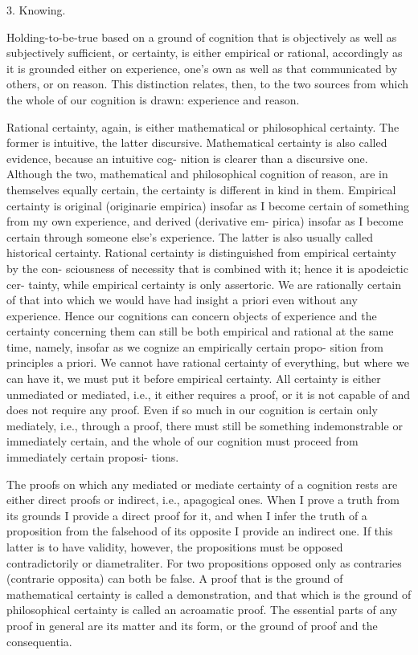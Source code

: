3. Knowing.

Holding-to-be-true based on a ground of cognition that is
objectively as well as subjectively sufficient, or certainty, is
either empirical or rational, accordingly as it is grounded either
on experience, one's own as well as that communicated by others, or on reason.
This distinction relates, then, to the two sources from which
the whole of our cognition is drawn: experience and reason.

Rational certainty, again, is either mathematical or philosophical certainty.
The former is intuitive, the latter discursive.
Mathematical certainty is also called evidence, because an intuitive cog-
nition is clearer than a discursive one. Although the two, mathematical
and philosophical cognition of reason, are in themselves equally certain,
the certainty is different in kind in them.
Empirical certainty is original (originarie empirica) insofar as I become
certain of something from my own experience, and derived (derivative em-
pirica) insofar as I become certain through someone else's experience. The
latter is also usually called historical certainty.
Rational certainty is distinguished from empirical certainty by the con-
sciousness of necessity that is combined with it; hence it is apodeictic cer-
tainty, while empirical certainty is only assertoric. We are rationally certain
of that into which we would have had insight a priori even without any
experience. Hence our cognitions can concern objects of experience and
the certainty concerning them can still be both empirical and rational at
the same time, namely, insofar as we cognize an empirically certain propo-
sition from principles a priori.
We cannot have rational certainty of everything, but where we can have
it, we must put it before empirical certainty.
All certainty is either unmediated or mediated, i.e., it either requires a
proof, or it is not capable of and does not require any proof. Even if so
much in our cognition is certain only mediately, i.e., through a proof,
there must still be something indemonstrable or immediately certain, and the
whole of our cognition must proceed from immediately certain proposi-
tions.

The proofs on which any mediated or mediate certainty of a cognition
rests are either direct proofs or indirect, i.e., apagogical ones.
When I prove a truth from its grounds I provide a direct proof for it,
and when I infer the truth of a proposition from the falsehood of its
opposite I provide an indirect one.
If this latter is to have validity, however,
the propositions must be opposed contradictorily or diametraliter.
For two propositions opposed only as contraries (contrarie opposita) can both be false.
A proof that is the ground of mathematical certainty is called a demonstration,
and that which is the ground of philosophical certainty is called an acroamatic proof.
The essential parts of any proof in general are its matter and its form,
or the ground of proof and the consequentia.

